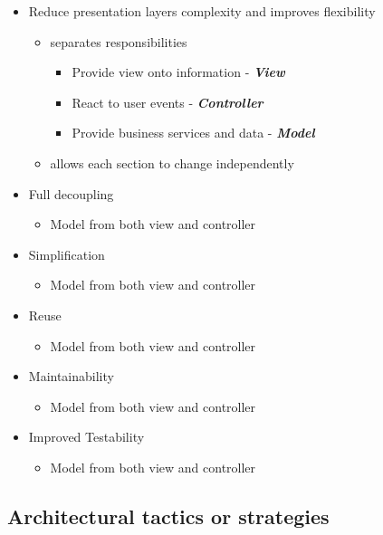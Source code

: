 \documentclass[a4paper,12pt]{article}
\begin{document}
	\begin{itemize}
		\item Reduce presentation layers complexity and  improves flexibility
			\begin{itemize}
				\item separates responsibilities
					\begin{itemize}
						\item Provide view onto information -\textbf{\textit{ View}}
						\item React to user events - \textbf{\textit{Controller}}
						\item Provide business services  and data - \textbf{\textit{Model}}
					\end{itemize}
				\item allows each section to change independently
			\end{itemize}
		\item Full decoupling
			\begin{itemize}
				\item Model from both view and controller
			\end{itemize}
		\item Simplification
			\begin{itemize}
				\item Model from both view and controller
			\end{itemize}
		\item Reuse
			\begin{itemize}
				\item Model from both view and controller
			\end{itemize}
		\item Maintainability
			\begin{itemize}
				\item Model from both view and controller
			\end{itemize}
		\item Improved Testability
			\begin{itemize}
				\item Model from both view and controller
			\end{itemize}
	\end{itemize}


\subsection{Architectural tactics or strategies}
\end{document}

